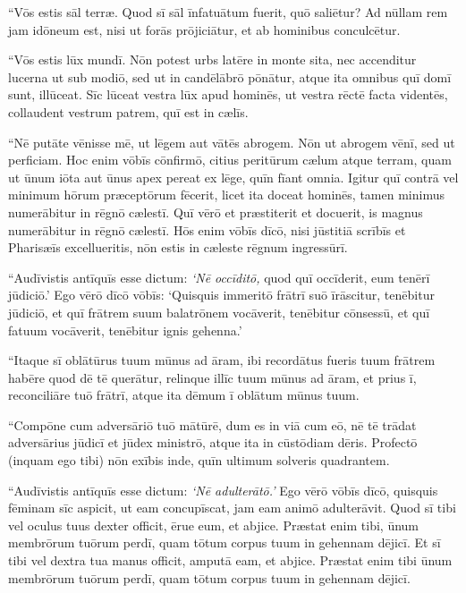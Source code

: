 \Versus ``Vōs estis sāl terræ. Quod sī sāl īnfatuātum fuerit, quō saliētur? Ad nūllam rem jam idōneum est, nisi ut forās prōjiciātur, et ab hominibus conculcētur.

\Versus ``Vōs estis lūx mundī. Nōn potest urbs latēre in monte sita, 
\Versus nec accenditur lucerna ut sub modiō, sed ut in candēlābrō pōnātur, atque ita omnibus quī domī sunt, illūceat. 
\Versus Sīc lūceat vestra lūx apud hominēs, ut vestra rēctē facta videntēs, collaudent vestrum patrem, quī est in cælīs.

\Versus ``Nē putāte vēnisse mē, ut lēgem aut vātēs abrogem. Nōn ut abrogem vēnī, sed ut perficiam. 
\Versus Hoc enim vōbīs cōnfirmō, citius peritūrum cælum atque terram, quam ut ūnum iōta aut ūnus apex pereat ex lēge, quīn fīant omnia. 
\Versus Igitur quī contrā vel minimum hōrum præceptōrum fēcerit, licet ita doceat hominēs, tamen minimus numerābitur in rēgnō cælestī. Quī vērō et præstiterit et docuerit, is magnus numerābitur in rēgnō cælestī. 
\Versus Hōs enim vōbīs dīcō, nisi jūstitiā scrībīs et Pharisæīs excellueritis, nōn estis in cæleste rēgnum ingressūrī.

\Versus ``Audīvistis antīquīs esse dictum: \emph{`Nē occīditō,} quod quī occīderit, eum tenērī jūdiciō.' 
\Versus Ego vērō dīcō vōbīs: `Quisquis immeritō frātrī suō īrāscitur, tenēbitur jūdiciō, et quī frātrem suum balatrōnem vocāverit, tenēbitur cōnsessū, et quī fatuum vocāverit, tenēbitur ignis gehenna.'

\Versus ``Itaque sī oblātūrus tuum mūnus ad āram, ibi recordātus fueris tuum frātrem habēre quod dē tē querātur, 
\Versus relinque illīc tuum mūnus ad āram, et prius ī, reconciliāre tuō frātrī, atque ita dēmum ī oblātum mūnus tuum. 

\Versus ``Compōne cum adversāriō tuō mātūrē, dum es in viā cum eō, nē tē trādat adversārius jūdicī et jūdex ministrō, atque ita in cūstōdiam dēris. 
\Versus Profectō (inquam ego tibi) nōn exībis inde, quīn ultimum solveris quadrantem.

\Versus ``Audīvistis antīquīs esse dictum: \emph{`Nē adulterātō.'}
\Versus Ego vērō vōbīs dīcō, quisquis fēminam sīc aspicit, ut eam concupīscat, jam eam animō adulterāvit. 
\Versus Quod sī tibi vel oculus tuus dexter officit, ērue eum, et abjice. Præstat enim tibi, ūnum membrōrum tuōrum perdī, quam tōtum corpus tuum in gehennam dējicī. 
\Versus Et sī tibi vel dextra tua manus officit, amputā eam, et abjice. Præstat enim tibi ūnum membrōrum tuōrum perdī, quam tōtum corpus tuum in gehennam dējicī.

